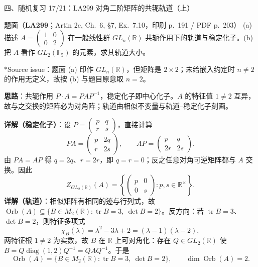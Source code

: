 \documentclass[aspectratio=169,10pt,fontset=none]{ctexbeamer}
\newcommand{\ex}[1]{\textcolor{accent}{\footnotesize\bfseries #1}}
\newcommand{\key}[1]{\textcolor{ink}{\bfseries #1}}
\newcommand{\starpt}{\textcolor{accent}{\bfseries$\ast$}}
\begin{document}
\begin{frame}[t]{四、随机复习 17/21：LA299 对角二阶矩阵的共轭轨道（上）}
\label{ex:LA299}
\scriptsize
\begin{block}{\footnotesize 题面（\ex{LA299}；Artin 2e, Ch.~6, \S7, Ex.~7.10，印刷 p.~191 / PDF p.~203）}
(a) 描述 $A=\begin{pmatrix}1&0\\0&2\end{pmatrix}$ 在一般线性群 $GL_n(\mathbb R)$ 共轭作用下的轨道与稳定化子。(b) 把 $A$ 看作 $GL_2(\mathbb F_5)$ 的元素，求其轨道大小。
\end{block}
\starpt{}Source issue：题面 (a) 印作 $GL_n(\mathbb R)$，但矩阵是 $2\times2$；未给嵌入约定时 $n\neq2$ 的作用无定义，故按 (b) 与题目原意取 $n=2$。

\key{思路}：共轭作用 $P\cdot A=PAP^{-1}$，稳定化子即中心化子。$A$ 的特征值 $1\neq2$ 互异，故与之交换的矩阵必为对角阵；轨道由相似不变量与轨道--稳定化子刻画。

\key{详解（稳定化子）}：设 $P=\begin{pmatrix}p&q\\r&s\end{pmatrix}$，直接计算
\[ PA=\begin{pmatrix}p&2q\\r&2s\end{pmatrix},\qquad AP=\begin{pmatrix}p&q\\2r&2s\end{pmatrix}. \]
由 $PA=AP$ 得 $q=2q$、$r=2r$，即 $q=r=0$；反之任意对角可逆矩阵都与 $A$ 交换。因此
\[ Z_{GL_2(\mathbb R)}(A)=\left\{\begin{pmatrix}p&0\\0&s\end{pmatrix}:p,s\in\mathbb R^\times\right\}. \]
\key{详解（轨道）}：相似矩阵有相同的迹与行列式，故 $\operatorname{Orb}(A)\subseteq\{B\in M_2(\mathbb R):\operatorname{tr}B=3,\ \det B=2\}$。反方向：若 $\operatorname{tr}B=3$、$\det B=2$，则特征多项式
\[ \chi_B(\lambda)=\lambda^2-3\lambda+2=(\lambda-1)(\lambda-2), \]
两特征根 $1\neq2$ 为实数，故 $B$ 在 $\mathbb R$ 上可对角化：存在 $Q\in GL_2(\mathbb R)$ 使 $B=Q\operatorname{diag}(1,2)Q^{-1}=QAQ^{-1}$。于是
\[ \operatorname{Orb}(A)=\{B\in M_2(\mathbb R):\operatorname{tr}B=3,\ \det B=2\},\qquad \dim\operatorname{Orb}(A)=2. \]
\end{frame}
\end{document}

